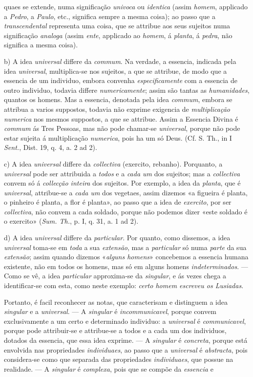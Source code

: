 quaes se extende, numa significação \emph{univoca} ou \emph{identica} (assim \emph{homem}, applicado a \emph{Pedro}, a \emph{Paulo}, etc., significa sempre a mesma coisa); ao passo que a \emph{transcendental} representa uma coisa, que se attribue aos seus sujeitos numa significação \emph{analoga} (assim \emph{ente}, applicado ao \emph{homem}, á \emph{planta}, á \emph{pedra}, não significa a mesma coisa).\par b) A idea \emph{universal} differe da \emph{commum}. Na verdade, a essencia, indicada pela idea \emph{universal}, multiplica-se nos sujeitos, a que se attribue, de modo que a essencia de um individuo, embora convenha \emph{especificamente} com a essencia de outro individuo, todavia differe \emph{numericamente}; assim são tantas as \emph{humanidades}, quantos os homens. Mas a essencia, denotada pela idea \emph{commum}, embora se attribua a varios suppostos, todavia não exprime exigencia de \emph{multiplicação numerica} nos mesmos suppostos, a que se attribue. Assim a Essencia Divina é \emph{commum} ás Tres Pessoas, mas não pode chamar-se \emph{universal}, porque não pode estar sujeita á multiplicação \emph{numerica}, pois ha um só Deus. (Cf. S. Th., in I \emph{Sent.}, Dist. 19, q. 4, a. 2 ad 2).\par c) A idea \emph{universal} differe da \emph{collectiva} (exercito, rebanho). Porquanto, a \emph{universal} pode ser attribuida a \emph{todos} e a \emph{cada um} dos sujeitos; mas a \emph{collectiva} convem só á \emph{collecção inteira} dos sujeitos. Por exemplo, a idea da \emph{planta}, que é \emph{universal}, attribue-se a \emph{cada um} dos vegetaes, assim dizemos «a figueira é planta, o pinheiro é planta, a flor é planta», ao passo que a idea de \emph{exercito}, por ser \emph{collectiva}, não convem a cada soldado, porque não podemos dizer «este soldado é o exercito» (\emph{Sum. Th.}, p. I, q. 31, a. 1 ad 2).\par d) A idea \emph{universal} differe da \emph{particular}. Por quanto, como dissemos, a idea \emph{universal} toma-se em \emph{toda} a sua \emph{extensão}, mas a \emph{particular} só numa \emph{parte} da sua \emph{extensão}; assim quando dizemos «\emph{alguns homens}» concebemos a essencia humana existente, não em todos os homens, mas só em alguns homens \emph{indeterminados}. --- Como se vê, a idea \emph{particular} approxima-se da \emph{singular}, e ás vezes chega a identificar-se com esta, como neste exemplo: \emph{certo homem escreveu os Lusiadas}.\par Portanto, é facil reconhecer as notas, que caracterisam e distinguem a idea \emph{singular} e a \emph{universal}. --- A \emph{singular} é \emph{incommunicavel}, porque convem exclusivamente a um certo e determinado individuo: a \emph{universal} é \emph{communicavel}, porque pode attribuir-se e attribue-se a todos e a cada um dos individuos, dotados da essencia, que essa idea exprime. --- A \emph{singular} é \emph{concreta}, porque está envolvida nas propriedades \emph{individuaes}, ao passo que a \emph{universal} é \emph{abstracta}, pois considera-se como que separada das propriedades \emph{individuaes}, que possue na realidade. --- A \emph{singular} é \emph{complexa}, pois que se compõe da \emph{essencia} e 